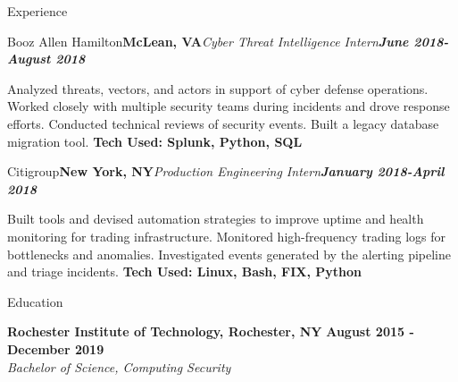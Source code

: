 \documentclass{resume}
\begin{document}
\begin{rSection}{Experience}
\begin{rSubsection}{Booz Allen Hamilton}{\bf McLean, VA}{\em \it Cyber Threat Intelligence Intern}{\em \bf June 2018-August 2018}
\item Analyzed threats, vectors, and actors in support of cyber defense operations. Worked closely with multiple security teams during incidents and drove response efforts. Conducted technical reviews of security events. Built a legacy database migration tool.
{\bf Tech Used: Splunk, Python, SQL}
\end{rSubsection}

\begin{rSubsection}{Citigroup}{\bf New York, NY}{\em \it Production Engineering Intern}{\em \bf January 2018-April 2018}
\item Built tools and devised automation strategies to improve uptime and health monitoring for trading infrastructure. Monitored high-frequency trading logs for bottlenecks and anomalies. Investigated events generated by the alerting pipeline and triage incidents.
{\bf Tech Used: Linux, Bash, FIX, Python}
\end{rSubsection}


\end{rSection}


\begin{rSection}{Education}

{\bf Rochester Institute of Technology, Rochester, NY} \hfill { \bf August 2015 - December 2019 }  
\\ \it Bachelor of Science, Computing Security\hfill {\bf }

\end{rSection}
\end{document}
